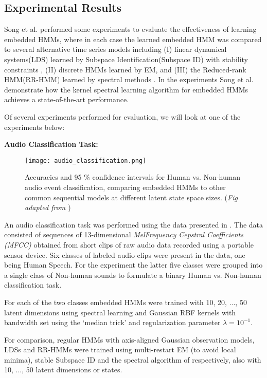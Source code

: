 
\subsection{Experimental Results}
Song et al.\cite{ref20} performed some experiments to evaluate the effectiveness
of learning embedded HMMs, where in each case the learned embedded HMM was compared to several alternative
time series models including (I) linear dynamical
systems(LDS) learned by Subspace Identification(Subspace ID)\cite{ref13} with
stability constraints \cite{ref25}, (II) discrete
HMMs learned by EM, and (III) the Reduced-rank
HMM(RR-HMM) learned by spectral methods \cite{ref7}. In the experiments Song et al.\cite{ref20} demonstrate how
the kernel spectral learning algorithm for embedded
HMMs achieves a state-of-the-art performance.

Of several experiments performed for evaluation, we will look at one of the experiments below:

\textbf{Audio Classification Task:}

\begin{figure}[h]
    \centering
    \texttt{[image: audio\_classification.png]}  
    \caption{Accuracies and 95 \% confidence intervals for Human
vs. Non-human audio event classification, comparing
embedded HMMs to other common sequential models at
different latent state space sizes. (\textit{Fig adapted from \cite{ref20}})}
    \label{fig:audio}
\end{figure}

An audio classification task was performed using the data presented in \cite{ref26}. The data consisted of sequences of 13-dimensional \textit{MelFrequency Cepstral Coefficients (MFCC)} obtained from short clips of raw audio data recorded using a portable sensor device. Six classes of labeled audio clips were present in the data, one being Human
Speech. 
For the experiment the latter five
classes were grouped into a single class of Non-human sounds to formulate a binary Human vs. Non-human classification
task. 

For each of the two classes embedded
HMMs were trained with 10, 20, ..., 50 latent dimensions using spectral learning and Gaussian RBF kernels with
bandwidth set using the ‘median trick’ and regularization
parameter $ \lambda = {10}^{-1}$.

For comparison, regular HMMs with
axis-aligned Gaussian observation models, LDSs and
RR-HMMs were trained using multi-restart EM (to
avoid local minima), stable Subspace ID and the spectral
algorithm of \cite{ref7} respectively, also
with 10, ..., 50 latent dimensions or states.


